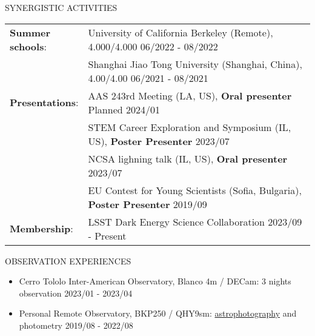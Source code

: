 \documentclass[11pt]{article} %
\begin{document}
\begin{section}{SYNERGISTIC ACTIVITIES}

\begin{tabular}{@{}p{0.2\linewidth}@{}p{0.8\linewidth}@{}}
    \textbf{Summer schools}: & University of California Berkeley (Remote), 4.000/4.000  \hfill 06/2022 - 08/2022\\
    & Shanghai Jiao Tong University (Shanghai, China), 4.00/4.00 \hfill 06/2021 - 08/2021\\
    \textbf{Presentations}: & AAS 243rd Meeting (LA, US), \textbf{Oral presenter} \hfill Planned 2024/01  \\
    & STEM Career Exploration and Symposium (IL, US), \textbf{Poster Presenter} \hfill 2023/07  \\
    & NCSA lighning talk (IL, US), \textbf{Oral presenter} \hfill 2023/07 \\
    & EU Contest for Young Scientists (Sofia, Bulgaria), \textbf{Poster Presenter} \hfill 2019/09 \\
    \textbf{Membership}: &LSST Dark Energy Science Collaboration \hfill 2023/09 - Present \\
\end{tabular}

\end{section}

\begin{section}{OBSERVATION EXPERIENCES}
    
\begin{itemize}[leftmargin=1.5em]
    \item Cerro Tololo Inter-American Observatory, Blanco 4m / DECam: 3 nights observation \hfill 2023/01 - 2023/04
    \item Personal Remote Observatory, BKP250 / QHY9sm: \href{https://yliu.fit/astrophotography/}{astrophotography} and photometry \hfill 2019/08 - 2022/08
\end{itemize}

\end{section}
\end{document}
